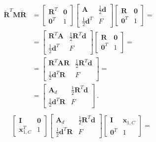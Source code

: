 \documentclass[letterpaper,10pt,italian]{jupyterBook}
\begin{document}
\begin{equation*}
\begin{split}\begin{aligned}
 \widetilde{\mathbf{R}}^T \mathbf{M} \widetilde{\mathbf{R}}
 & = \begin{bmatrix}  \mathbf{R}^T & \mathbf{0} \\ \mathbf{0}^T & 1  \end{bmatrix} \begin{bmatrix} \mathbf{A} & \frac{1}{2} \mathbf{d} \\ \frac{1}{2} \mathbf{d}^T & F \end{bmatrix} \begin{bmatrix} \mathbf{R} & \mathbf{0} \\ \mathbf{0}^T & 1 \end{bmatrix} = \\
 & = \begin{bmatrix} \mathbf{R}^T \mathbf{A} & \frac{1}{2}\mathbf{R}^T \mathbf{d} \\ \frac{1}{2} \mathbf{d}^T & F \end{bmatrix} \begin{bmatrix} \mathbf{R} & \mathbf{0} \\ \mathbf{0}^T & 1 \end{bmatrix} = \\ 
 & = \begin{bmatrix} \mathbf{R}^T \mathbf{A} \mathbf{R} & \frac{1}{2}\mathbf{R}^T \mathbf{d} \\ \frac{1}{2} \mathbf{d}^T \mathbf{R} & F \end{bmatrix} = \\ 
 & = \begin{bmatrix} \mathbf{A}_d & \frac{1}{2}\mathbf{R}^T \mathbf{d} \\ \frac{1}{2} \mathbf{d}^T \mathbf{R} & F \end{bmatrix} \ .
\end{aligned}\end{split}
\end{equation*}\begin{equation*}
\begin{split}\begin{aligned}
 & \begin{bmatrix} \mathbf{I} & \mathbf{0} \\ \mathbf{x}_{1,C}^T & 1 \end{bmatrix} \begin{bmatrix} \mathbf{A}_d & \frac{1}{2} \mathbf{R}^T \mathbf{d} \\ \frac{1}{2} \mathbf{d}^T \mathbf{R} & F \end{bmatrix} \begin{bmatrix} \mathbf{I} & \mathbf{x}_{1,C} \\ \mathbf{0}^T & 1 \end{bmatrix} = \\

\end{aligned}
\end{split}
\end{equation*}
\end{document}
